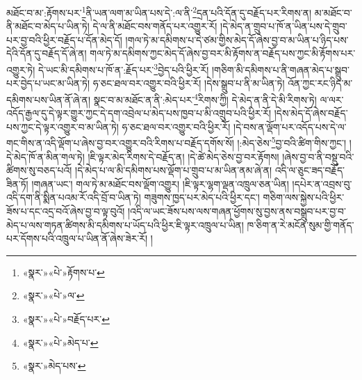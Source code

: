 མཐོང་བ་མ་:རྟོགས་པར་\footnote{«སྣར་»«པེ་»རྟོགས་པ་}ནི་ཡན་ལག་མ་ཡིན་པས་དེ་:ལ་ནི་\footnote{«སྣར་»«པེ་»ལ་}དྲན་པའི་དོན་དུ་བརྗོད་པར་རིགས་ན། མ་མཐོང་བ་ནི་མཐོང་བ་མེད་པ་ཡིན་ཏེ། དེ་ལ་ནི་མཐོང་བས་གནོད་པར་འགྱུར་རོ། །དེ་མེད་ན་གྲུབ་པ་ཁོ་ན་ཡིན་པས་དེ་གྲུབ་པར་བྱ་བའི་ཕྱིར་བརྗོད་པ་དོན་མེད་དོ། །གལ་ཏེ་མ་དམིགས་པ་དེ་ཙམ་གྱིས་མེད་དོ་ཞེས་བྱ་བ་མ་ཡིན་པ་ཉིད་པས་དེའི་དོན་དུ་བརྗོད་དོ་ཞེ་ན། གལ་ཏེ་མ་དམིགས་ཀྱང་མེད་དོ་ཞེས་བྱ་བར་མི་རྟོགས་ན་བརྗོད་པས་ཀྱང་མི་རྟོགས་པར་འགྱུར་ཏེ། དེ་ཡང་མི་དམིགས་པ་ཁོ་ན་:རྗོད་པར་\footnote{«སྣར་»«པེ་»བརྗོད་པར་}བྱེད་པའི་ཕྱིར་རོ། །གཅིག་མི་དམིགས་པ་ནི་གཞན་མེད་པ་སྒྲུབ་པར་བྱེད་པ་ཡང་མ་ཡིན་ཏེ། ཧ་ཅང་ཐལ་བར་འགྱུར་བའི་ཕྱིར་རོ། །དེས་སྒྲུབ་པ་ནི་མ་ཡིན་ཏེ། འོན་ཀྱང་རང་ཉིད་མ་དམིགས་པས་ཡིན་ནོ་ཞེ་ན། སྣང་བ་མ་མཐོང་ན་ནི་:མེད་པར་\footnote{«སྣར་»«པེ་»མེད་པ་}རིགས་ཀྱི། དེ་མེད་ན་ནི་དེ་མི་རིགས་ཏེ། ལ་ལར་འདོད་རྒྱལ་དུ་དེ་ལྟར་གྱུར་ཀྱང་དེ་དག་འབྲེལ་པ་མེད་པས་ཁྱབ་པ་མི་འགྲུབ་པའི་ཕྱིར་རོ། །དེས་མེད་དོ་ཞེས་བརྗོད་པས་ཀྱང་དེ་ལྟར་འགྱུར་བ་མ་ཡིན་ཏེ། ཧ་ཅང་ཐལ་བར་འགྱུར་བའི་ཕྱིར་རོ། །དེ་བས་ན་ལྡོག་པར་འདོད་པས་དེ་ལ་གང་གིས་ན་འདི་ལྡོག་པ་ཞེས་བྱ་བར་འགྱུར་བའི་རིགས་པ་བརྗོད་དགོས་སོ། །:མེད་ཅེས་\footnote{«སྣར་»མེད་པས་}བྱ་བའི་ཚིག་གིས་ཀྱང་། །དེ་མེད་ཁོ་ན་མིན་གལ་ཏེ། །ཇི་ལྟར་མེད་རིགས་དེ་བརྗོད་ན། །དེ་ཚེ་མེད་ཅེས་བྱ་བར་རྟོགས། །ཞེས་བྱ་བ་ནི་བསྡུ་བའི་ཚིགས་སུ་བཅད་པའོ། །དེ་མེད་པ་ལ་མི་དམིགས་པས་ལྡོག་པ་གྲུབ་པ་མ་ཡིན་ནམ་ཞེ་ན། འདི་ལ་ཅུང་ཟད་བརྗོད་ཟིན་ཏོ། །གཞན་ཡང་། གལ་ཏེ་མ་མཐོང་བས་ལྡོག་འགྱུར། །ཇི་ལྟར་ལྷག་ལྡན་འཁྲུལ་ཅན་ཡིན། །དཔེར་ན་འབྲས་བུ་འདི་དག་ནི་སྨིན་པའམ་རོ་འདི་བྲོ་བ་ཡིན་ཏེ། གཟུགས་ཁྱད་པར་མེད་པའི་ཕྱིར་དང་། གཅིག་ལས་སྐྱེས་པའི་ཕྱིར་ཟོས་པ་དང་འདྲ་བའོ་ཞེས་བྱ་བ་ལྟ་བུའོ། །འདི་ལ་ཡང་ཟོས་པས་ལས་གཞན་ཕྱོགས་སུ་བྱས་ནས་བསྒྲུབ་པར་བྱ་བ་མེད་པ་ལས་གཏན་ཚིགས་མི་དམིགས་པ་ཡོད་པའི་ཕྱིར་ཇི་ལྟར་འཁྲུལ་པ་ཡིན། ཁ་ཅིག་ན་རེ་མངོན་སུམ་གྱི་གནོད་པར་དོགས་པའི་འཁྲུལ་པ་ཡིན་ནོ་ཞེས་ཟེར་རོ། །
